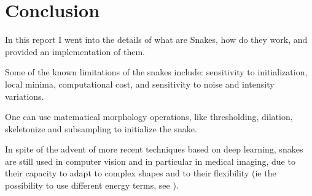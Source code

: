\documentclass[24pt]{article}
\begin{document}




\section{Conclusion}

In this report I went into the details of what are Snakes, how do they work, and provided an implementation of them.

Some of the known limitations of the snakes include: sensitivity to initialization, local minima, computational cost, and sensitivity to noise and intensity variations. 

One can use matematical morphology operations, like thresholding, dilation, skeletonize  and subsampling to initialize the snake. 




In spite of the advent of more recent techniques based on deep learning, snakes are still used in computer vision and in particular in medical imaging, due to their capacity to adapt to complex shapes and to their flexibility (ie the possibility to use different energy terms, see \citep{Snake}).


%
%




\end{document}
